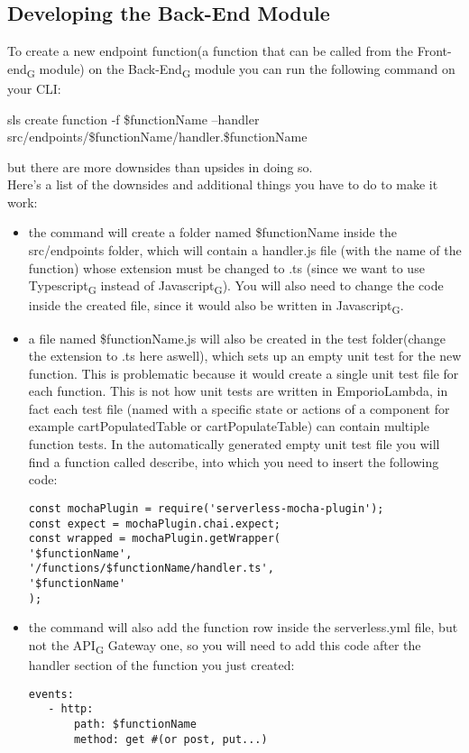 \subsection{Developing the Back-End Module}
To create a new endpoint function(a function that can be called from the Front-end\textsubscript{G} module) on the Back-End\textsubscript{G} module you can run the following command on your CLI: 
\begin{center}
sls create function -f \$functionName --handler src/endpoints/\$functionName/handler.\$functionName
\end{center}
but there are more downsides than upsides in doing so.\\
Here's a list of the downsides and additional things you have to do to make it work:
\begin{itemize}
\item the command will create a folder named \$functionName inside the src/endpoints folder, which will contain a handler.js file (with the name of the function) whose extension must be changed to .ts (since we want to use Typescript\textsubscript{G} instead of Javascript\textsubscript{G}). You will also need to change the code inside the created file, since it would also be written in Javascript\textsubscript{G}.
\item a file named \$functionName.js will also be created in the test folder(change the extension to .ts here aswell), which sets up an empty unit test for the new function. This is problematic because it would create a single unit test file for each function. This is not how unit tests are written in EmporioLambda, in fact each test file (named with a specific state or actions of a component for example cartPopulatedTable or cartPopulateTable) can contain multiple function tests.
In the automatically generated empty unit test file you will find a function called describe, into which you need to insert the following code:
\begin{lstlisting}
const mochaPlugin = require('serverless-mocha-plugin');
const expect = mochaPlugin.chai.expect;
const wrapped = mochaPlugin.getWrapper(
'$functionName', 
'/functions/$functionName/handler.ts',
'$functionName'
);
\end{lstlisting}
\item the command will also add the function row inside the serverless.yml file, but not the API\textsubscript{G} Gateway one, so you will need to add this code after the handler section of the function you just created:
\begin{lstlisting}
events:
   - http:
       path: $functionName
       method: get #(or post, put...)
\end{lstlisting}
\end{itemize}
